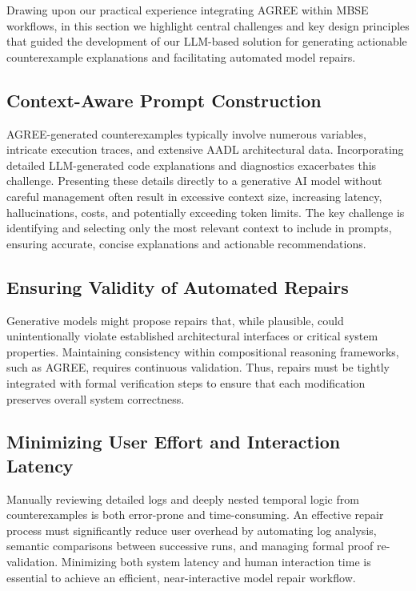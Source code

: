 Drawing upon our practical experience integrating AGREE within MBSE workflows, in this section we highlight central challenges and key design principles that guided the development of our LLM-based solution for generating actionable counterexample explanations and facilitating automated model repairs.

\subsection{Context-Aware Prompt Construction}
AGREE-generated counterexamples typically involve numerous variables, intricate execution traces, and extensive AADL architectural data. Incorporating detailed LLM-generated code explanations and diagnostics exacerbates this challenge. Presenting these details directly to a generative AI model without careful management %
often result in excessive context size, increasing latency, hallucinations, costs, and potentially exceeding token limits.
The key challenge is identifying and selecting only the most relevant context to include in prompts, ensuring accurate, concise explanations and actionable recommendations.

\subsection{Ensuring Validity of Automated Repairs}
Generative models might propose repairs that, while plausible, could unintentionally violate established architectural interfaces or critical system properties. Maintaining consistency within compositional reasoning frameworks, such as AGREE, requires continuous validation. Thus, repairs must be tightly integrated with formal verification steps to ensure that each modification preserves overall system correctness.

\subsection{Minimizing User Effort and Interaction Latency}
Manually reviewing detailed logs and deeply nested temporal logic from counterexamples is both error-prone and time-consuming. An effective repair process must significantly reduce user overhead by automating log analysis, semantic comparisons between successive runs, and managing formal proof re-validation. Minimizing both system latency and human interaction time is essential to achieve an efficient, near-interactive model repair workflow.

